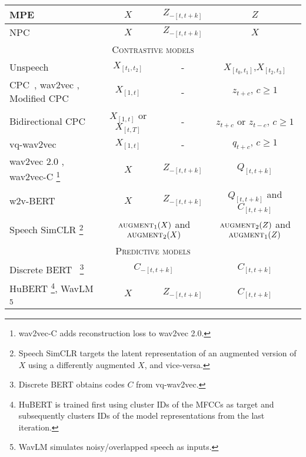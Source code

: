 \begin{table*}[!htb]
{\begin{tabular}{l|c|c|c}
    \midrule 
    MPE~\cite{liu2020masked} & $X$ &  $Z_{-[t,t+k]}$  & $Z$    \\ %
    \midrule
    NPC~\cite{liu21l_interspeech}      & $X$  &   $Z_{-[t,t+k]}$  &    $X$   \\ %
    \midrule
    \midrule
    \multicolumn{4}{c}{\textsc{Contrastive models}} \\
    \midrule
    \midrule
    Unspeech \cite{milde2018unspeech}       &   $X_{[t_1,t_2]}$ &   \textsc{-}   &  $X_{[t_0,t_1]}$,$X_{[t_2,t_3]}$ \\
    \midrule 
    CPC~\cite{oord2018representation}, wav2vec \cite{schneider2019wav2vec}, Modified CPC \cite{riviere2020unsupervised}         & $X_{[1,t]}$   &    \textsc{-}           & $z_{t+c},\, c\geq1$   \\ %
    \midrule 
    Bidirectional CPC \cite{kawakami2020learning}      & $X_{[1,t]}$ or $X_{[t,T]}$ &  \textsc{-}    &    $z_{t+c}$ or $z_{t-c},\, c\geq1$   \\
    \midrule 
    vq-wav2vec \cite{Baevski2020vq-wav2vec}     &   $X_{[1,t]}$ &   \textsc{-}    &   $q_{t+c},\, c\geq1$   \\ 
    \midrule 
    wav2vec 2.0 \cite{baevski2020wav2vec}, wav2vec-C \cite{sadhu21_interspeech}\footnote{wav2vec-C adds reconstruction loss to wav2vec 2.0.}    & $X$             & $Z_{-[t,t+k]}$          & $Q_{[t,t+k]}$ \\
    \midrule 
    w2v-BERT \cite{w2vbert}     &$X$ &    $Z_{-[t,t+k]}$   &     $Q_{[t,t+k]}$ and $C_{[t,t+k]}$     \\
    \midrule
    Speech SimCLR \cite{SpeechSimCLR}\footnote{Speech SimCLR targets the latent representation of an augmented version of $X$ using a differently augmented $X$, and vice-versa.}    & \multicolumn{2}{c|}{$\textsc{augment}_1(X)$ and $\textsc{augment}_2(X)$}     &    $\textsc{augment}_2(Z)$ and $\textsc{augment}_1(Z)$   \\ 
    \midrule
    \midrule 
    \multicolumn{4}{c}{\textsc{Predictive models}} \\
    \midrule
    \midrule
    Discrete BERT~\cite{Baevski2020vq-wav2vec,baevski2019effectiveness} \footnote{Discrete BERT obtains codes $C$ from vq-wav2vec.}      &   \multicolumn{2}{c|}{$C_{-[t,t+k]}$}   & $C_{[t,t+k]}$  \\
    \midrule 
    HuBERT \cite{hsu2021hubert}\footnote{HuBERT is trained first using cluster IDs of the MFCCs as target and subsequently clusters IDs of the model representations from the last iteration.}, WavLM \cite{chen2021wavlm}\footnote{WavLM simulates noisy/overlapped speech as inputs.}  & $X$             & $Z_{-[t,t+k]}$          & $C_{[t,t+k]}$  \\ 

\end{tabular}}
\end{table*}
